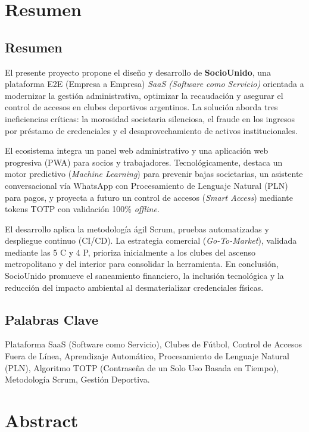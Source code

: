 \section{Resumen}

\subsection{Resumen}

El presente proyecto propone el diseño y desarrollo de \textbf{SocioUnido}, una plataforma E2E (Empresa a Empresa) \textit{SaaS (Software como Servicio)} orientada a modernizar la gestión administrativa, optimizar la recaudación y asegurar el control de accesos en clubes deportivos argentinos. La solución aborda tres ineficiencias críticas: la morosidad societaria silenciosa, el fraude en los ingresos por préstamo de credenciales y el desaprovechamiento de activos institucionales.

El ecosistema integra un panel web administrativo y una aplicación web progresiva (PWA) para socios y trabajadores. Tecnológicamente, destaca un motor predictivo (\textit{Machine Learning}) para prevenir bajas societarias, un asistente conversacional vía WhatsApp con Procesamiento de Lenguaje Natural (PLN) para pagos, y proyecta a futuro un control de accesos (\textit{Smart Access}) mediante tokens TOTP con validación 100\% \textit{offline}.

El desarrollo aplica la metodología ágil Scrum, pruebas automatizadas y despliegue continuo (CI/CD). La estrategia comercial (\textit{Go-To-Market}), validada mediante las 5 C y 4 P, prioriza inicialmente a los clubes del ascenso metropolitano y del interior para consolidar la herramienta. En conclusión, SocioUnido promueve el saneamiento financiero, la inclusión tecnológica y la reducción del impacto ambiental al desmaterializar credenciales físicas.

\subsection{Palabras Clave}

Plataforma SaaS (Software como Servicio), Clubes de Fútbol, Control de Accesos Fuera de Línea, Aprendizaje Automático, Procesamiento de Lenguaje Natural (PLN), Algoritmo TOTP (Contraseña de un Solo Uso Basada en Tiempo), Metodología Scrum, Gestión Deportiva.

\newpage

\section{Abstract}

